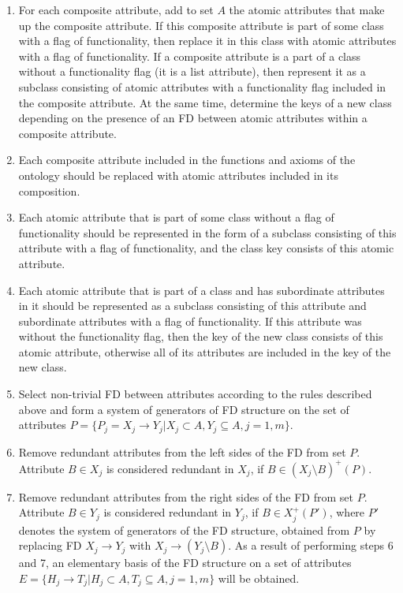 \documentclass{scndocument}
\begin{document}
\begin{enumerate}[noitemsep]
    \item For each composite attribute, add to set $A$ the atomic attributes that make up the composite attribute. If this composite attribute is part of some class with a flag of functionality, then replace it in this class with atomic attributes with a flag of functionality. If a composite attribute is a part of a class without a functionality flag (it is a list attribute), then represent it as a subclass consisting of atomic attributes with a functionality flag included in the composite attribute. At the same time, determine the keys of a new class depending on the presence of an FD between atomic attributes within a composite attribute.
    \item Each composite attribute included in the functions and axioms of the ontology should be replaced with atomic attributes included in its composition.
    \item Each atomic attribute that is part of some class without a flag of functionality should be represented in the form of a subclass consisting of this attribute with a flag of functionality, and the class key consists of this atomic attribute.
    \item Each atomic attribute that is part of a class and has subordinate attributes in it should be represented as a subclass consisting of this attribute and subordinate attributes with a flag of functionality. If this attribute was without the functionality flag, then the key of the new class consists of this atomic attribute, otherwise all of its attributes are included in the key of the new class.
    \item Select non-trivial FD between attributes according to the rules described above and form a system of generators of FD structure on the set of attributes $P = \{P_j = X_j \to Y_j | X_j \subset A, Y_j \subseteq A, j = 1, m\}$.
    \item Remove redundant attributes from the left sides of the FD from set $P$. Attribute $B \in X_j$ is considered redundant in $X_j$, if $B \in (X_j \setminus B)^+(P)$.
    \item Remove redundant attributes from the right sides of the FD from set $P$. Attribute $B \in Y_j$ is considered redundant in $Y_j$, if $B \in X_j^+(P')$, where $P'$ denotes the system of generators of the FD structure, obtained from $P$ by replacing FD $X_j \to Y_j$ with $X_j \to (Y_j \setminus B)$. As a result of performing steps 6 and 7, an elementary basis of the FD structure on a set of attributes $E = \{H_j \to T_j | H_j \subset A, T_j \subseteq A, j = 1, m\}$ will be obtained.

\end{enumerate}
\end{document}
